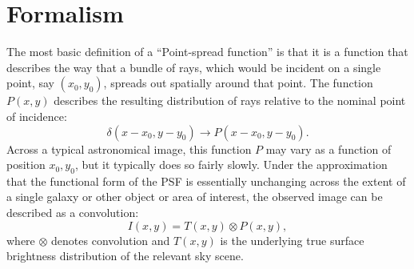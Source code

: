 \documentclass{aastex63}
\begin{document}
\section{Formalism}\label{sec:formalism}

The most basic definition of a ``Point-spread function'' is that it is a function that describes the way that a bundle of rays, which would be incident on a single point, say $(x_0,y_0)$, spreads out spatially around that point.  
The function $P(x,y)$ describes the resulting distribution of rays relative to the nominal point of incidence:
\begin{equation}
    \delta(x-x_0,y-y_0) \rightarrow P(x-x_0,y-y_0).
\end{equation}
Across a typical astronomical image, this function $P$ may vary as a function of position $x_0,y_0$, but it typically does so fairly slowly.  Under the approximation that the functional form of the PSF is essentially unchanging across the extent of a single galaxy or other object or area of interest, the observed image can be described as a convolution:
\begin{equation}
I(x,y) = T(x,y) \otimes P(x,y),
\end{equation}
where $\otimes$ denotes convolution and $T(x,y)$ is the underlying true surface brightness distribution of the relevant sky scene.
\end{document}

